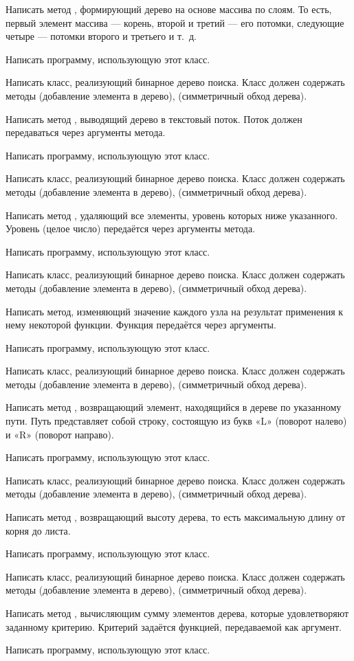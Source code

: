 Написать метод , формирующий дерево на основе массива
по слоям. То есть, первый элемент массива — корень, второй и третий —
его потомки, следующие четыре — потомки второго и третьего и т.~д.

Написать программу, использующую этот класс.

\task Написать класс, реализующий бинарное дерево поиска. Класс должен
содержать методы  (добавление элемента в дерево),
 (симметричный обход дерева).

Написать метод , выводящий дерево в текстовый поток. Поток
должен передаваться через аргументы метода.

Написать программу, использующую этот класс.

\task Написать класс, реализующий бинарное дерево поиска. Класс должен
содержать методы  (добавление элемента в дерево),
 (симметричный обход дерева).

Написать метод , удаляющий все элементы, уровень которых
ниже указанного. Уровень (целое число) передаётся через аргументы
метода.

Написать программу, использующую этот класс.

\task Написать класс, реализующий бинарное дерево поиска. Класс должен
содержать методы  (добавление элемента в дерево),
 (симметричный обход дерева).

Написать метод, изменяющий значение каждого узла на результат
применения к нему некоторой функции. Функция передаётся через
аргументы.

Написать программу, использующую этот класс.

\task Написать класс, реализующий бинарное дерево поиска. Класс должен
содержать методы  (добавление элемента в дерево),
 (симметричный обход дерева).

Написать метод , возвращающий элемент, находящийся в
дереве по указанному пути. Путь представляет собой
строку, состоящую из букв «L» (поворот налево) и «R» (поворот
направо).

Написать программу, использующую этот класс.

\task Написать класс, реализующий бинарное дерево поиска. Класс должен
содержать методы  (добавление элемента в дерево),
 (симметричный обход дерева).

Написать метод , возвращающий высоту дерева, то есть
максимальную длину от корня до листа.

Написать программу, использующую этот класс.

\task Написать класс, реализующий бинарное дерево поиска. Класс должен
содержать методы  (добавление элемента в дерево),
 (симметричный обход дерева).

Написать метод , вычисляющим сумму элементов дерева, которые
удовлетворяют заданному критерию. Критерий задаётся функцией,
передаваемой как аргумент.

Написать программу, использующую этот класс.